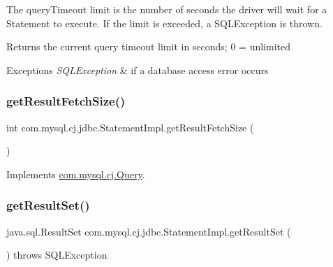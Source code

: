 The query\+Timeout limit is the number of seconds the driver will wait for a Statement to execute. If the limit is exceeded, a S\+Q\+L\+Exception is thrown.

\begin{DoxyReturn}{Returns}
the current query timeout limit in seconds; 0 = unlimited
\end{DoxyReturn}

\begin{DoxyExceptions}{Exceptions}
{\em S\+Q\+L\+Exception} & if a database access error occurs \\
\hline
\end{DoxyExceptions}
\mbox{\label{classcom_1_1mysql_1_1cj_1_1jdbc_1_1_statement_impl_a1c6f564765bab67e9f9330b362f930ca}} 
\subsubsection{\texorpdfstring{get\+Result\+Fetch\+Size()}{getResultFetchSize()}}
{\footnotesize\ttfamily int com.\+mysql.\+cj.\+jdbc.\+Statement\+Impl.\+get\+Result\+Fetch\+Size (\begin{DoxyParamCaption}{ }\end{DoxyParamCaption})}



Implements \mbox{\hyperlink{interfacecom_1_1mysql_1_1cj_1_1_query_a6f08d61e84781710d7e9c4680c2835b3}{com.\+mysql.\+cj.\+Query}}.

\mbox{\label{classcom_1_1mysql_1_1cj_1_1jdbc_1_1_statement_impl_a8bf30f2ecfd13ebcfbde03b082172bb1}} 
\subsubsection{\texorpdfstring{get\+Result\+Set()}{getResultSet()}}
{\footnotesize\ttfamily java.\+sql.\+Result\+Set com.\+mysql.\+cj.\+jdbc.\+Statement\+Impl.\+get\+Result\+Set (\begin{DoxyParamCaption}{ }\end{DoxyParamCaption}) throws S\+Q\+L\+Exception}

